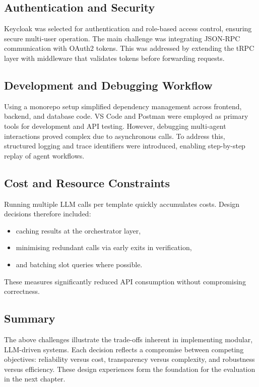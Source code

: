 \subsection*{Authentication and Security}
Keycloak was selected for authentication and role-based access control, ensuring secure multi-user operation. The main challenge was integrating JSON-RPC communication with OAuth2 tokens. This was addressed by extending the tRPC layer with middleware that validates tokens before forwarding requests.

\subsection*{Development and Debugging Workflow}
Using a monorepo setup simplified dependency management across frontend, backend, and database code. VS Code and Postman were employed as primary tools for development and API testing. However, debugging multi-agent interactions proved complex due to asynchronous calls. To address this, structured logging and trace identifiers were introduced, enabling step-by-step replay of agent workflows.

\subsection*{Cost and Resource Constraints}
Running multiple LLM calls per template quickly accumulates costs. Design decisions therefore included:
\begin{itemize}
  \item caching results at the orchestrator layer,
  \item minimising redundant calls via early exits in verification,
  \item and batching slot queries where possible.
\end{itemize}
These measures significantly reduced API consumption without compromising correctness.

\subsection*{Summary}
The above challenges illustrate the trade-offs inherent in implementing modular, LLM-driven systems. Each decision reflects a compromise between competing objectives: reliability versus cost, transparency versus complexity, and robustness versus efficiency. These design experiences form the foundation for the evaluation in the next chapter.
